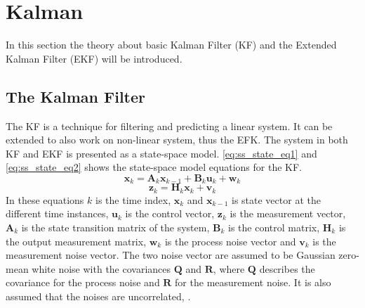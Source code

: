 \documentclass[Main]{subfiles}
\begin{document}
\section{Kalman} %
	\label{sec:kalman}
In this section the theory about basic Kalman Filter (KF) and the Extended Kalman Filter (EKF) will be introduced.
\subsection{The Kalman Filter}
The KF is a technique for filtering and predicting a linear system. 
It can be extended to also work on non-linear system, thus the EFK. 
The system in both KF and EKF is presented as a state-space model.
\autoref{eq:ss_state_eq1} and \autoref{eq:ss_state_eq2} shows the state-space model equations for the KF.
\begin{equation}
\label{eq:ss_state_eq1}
\mathbf{x}_k = \mathbf{A}_k \mathbf{x}_{k-1} + \mathbf{B}_k \mathbf{u}_k + \mathbf{w}_k
\end{equation}
\begin{equation}
\label{eq:ss_state_eq2}
\mathbf{z}_k = \mathbf{H}_k \mathbf{x}_k + \mathbf{v}_k
\end{equation}
In these equations $k$ is the time index, $\mathbf{x}_k$ and $\mathbf{x}_{k-1}$ is state vector at the different time instances, $\mathbf{u}_k$ is the control vector, $\mathbf{z}_k$ is the measurement vector, $\mathbf{A}_k$ is the state transition matrix of the system, $\mathbf{B}_k$ is the control matrix, $\mathbf{H}_k$ is the output measurement matrix, $\mathbf{w}_k$ is the process noise vector and $\mathbf{v}_k$ is the measurement noise vector.
The two noise vector are assumed to be Gaussian zero-mean white noise with the covariances $\mathbf{Q}$ and $\mathbf{R}$, where $\mathbf{Q}$ describes the covariance for the process noise and $\mathbf{R}$ for the measurement noise. 
It is also assumed that the noises are uncorrelated, \citep{Simon2006}.
\end{document}
